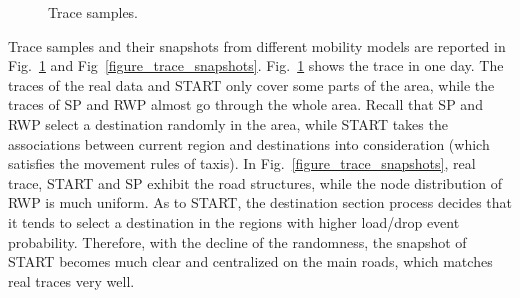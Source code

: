 \begin{figure}[!t]
\centering
{}
\caption{Trace samples.}\label{figure_tracesample}
\end{figure}


Trace samples and their snapshots from different mobility models are reported in Fig.~\ref{figure_tracesample} and Fig~\ref{figure_trace_snapshots}. Fig.~\ref{figure_tracesample} shows the trace in one day. The traces of the real data and START only cover some parts of the area, while the traces of SP and RWP almost go through the whole area. Recall that SP and RWP select a destination randomly in the area, while START takes the associations between current region and destinations into consideration (which satisfies the movement rules of taxis). In Fig.~\ref{figure_trace_snapshots}, real trace, START and SP exhibit the road structures, while the node distribution of RWP is much uniform. As to START, the destination section process decides that it tends to select a destination in the regions with higher load/drop event probability. Therefore, with the decline of the randomness, the snapshot of START becomes much clear and centralized on the main roads, which matches real traces very well.

